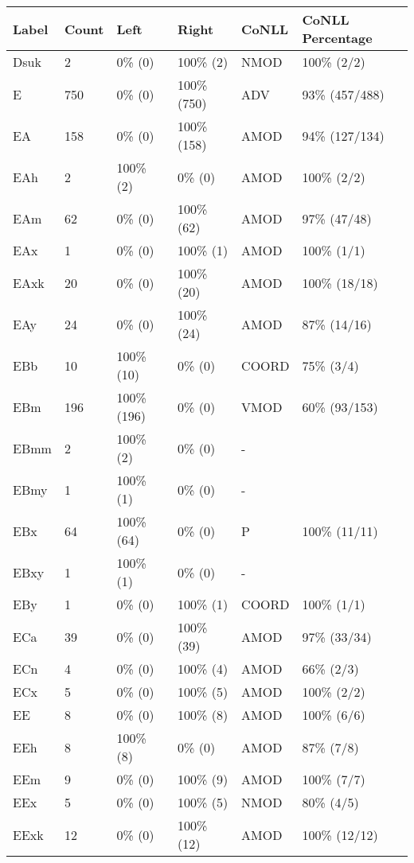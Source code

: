 \begin{figure*}
\begin{tabular}{|l|l|l|l||l|l|}
\hline
Label & Count & Left & Right & CoNLL & CoNLL Percentage\\ 
\hline
 Dsuk & 2 & 0\% (0) & 100\% (2) & NMOD & 100\% (2/2) \\ 
\hline
 E & 750 & 0\% (0) & 100\% (750) & ADV & 93\% (457/488) \\ 
\hline
 EA & 158 & 0\% (0) & 100\% (158) & AMOD & 94\% (127/134) \\ 
\hline
 EAh & 2 & 100\% (2) & 0\% (0) & AMOD & 100\% (2/2) \\ 
\hline
 EAm & 62 & 0\% (0) & 100\% (62) & AMOD & 97\% (47/48) \\ 
\hline
 EAx & 1 & 0\% (0) & 100\% (1) & AMOD & 100\% (1/1) \\ 
\hline
 EAxk & 20 & 0\% (0) & 100\% (20) & AMOD & 100\% (18/18) \\ 
\hline
 EAy & 24 & 0\% (0) & 100\% (24) & AMOD & 87\% (14/16) \\ 
\hline
 EBb & 10 & 100\% (10) & 0\% (0) & COORD & 75\% (3/4) \\ 
\hline
 EBm & 196 & 100\% (196) & 0\% (0) & VMOD & 60\% (93/153) \\ 
\hline
 EBmm & 2 & 100\% (2) & 0\% (0) & - &  \\ 
\hline
 EBmy & 1 & 100\% (1) & 0\% (0) & - &  \\ 
\hline
 EBx & 64 & 100\% (64) & 0\% (0) & P & 100\% (11/11) \\ 
\hline
 EBxy & 1 & 100\% (1) & 0\% (0) & - &  \\ 
\hline
 EBy & 1 & 0\% (0) & 100\% (1) & COORD & 100\% (1/1) \\ 
\hline
 ECa & 39 & 0\% (0) & 100\% (39) & AMOD & 97\% (33/34) \\ 
\hline
 ECn & 4 & 0\% (0) & 100\% (4) & AMOD & 66\% (2/3) \\ 
\hline
 ECx & 5 & 0\% (0) & 100\% (5) & AMOD & 100\% (2/2) \\ 
\hline
 EE & 8 & 0\% (0) & 100\% (8) & AMOD & 100\% (6/6) \\ 
\hline
 EEh & 8 & 100\% (8) & 0\% (0) & AMOD & 87\% (7/8) \\ 
\hline
 EEm & 9 & 0\% (0) & 100\% (9) & AMOD & 100\% (7/7) \\ 
\hline
 EEx & 5 & 0\% (0) & 100\% (5) & NMOD & 80\% (4/5) \\ 
\hline
 EExk & 12 & 0\% (0) & 100\% (12) & AMOD & 100\% (12/12) \\ 

\end{tabular}
\end{figure*}

